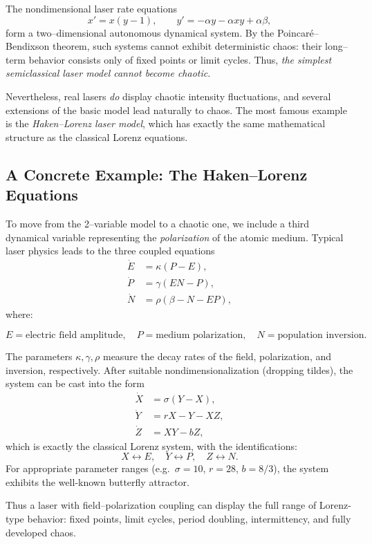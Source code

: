 \documentclass[11pt]{amsart}
\begin{document}
The nondimensional laser rate equations
\[
x' = x (y - 1), \qquad 
y' = - \alpha y - \alpha x y + \alpha \beta,
\]
form a two–dimensional autonomous dynamical system.  
By the Poincaré–Bendixson theorem, such systems cannot exhibit deterministic
chaos: their long–term behavior consists only of fixed points or limit cycles.
Thus, \emph{the simplest semiclassical laser model cannot become chaotic}.

Nevertheless, real lasers \emph{do} display chaotic intensity fluctuations, and
several extensions of the basic model lead naturally to chaos.  The most
famous example is the \emph{Haken–Lorenz laser model}, which has exactly the
same mathematical structure as the classical Lorenz equations. 

\subsection{A Concrete Example: The Haken--Lorenz Equations}

To move from the 2--variable model to a chaotic one, we include a third
dynamical variable representing the \emph{polarization} of the atomic medium.
Typical laser physics leads to the three coupled equations
\begin{align}
\dot E &= \kappa (P - E), \label{HL1}\\[2mm]
\dot P &= \gamma (E N - P), \label{HL2}\\[2mm]
\dot N &= \rho (\beta - N - E P), \label{HL3}
\end{align}
where:

\[
E = \text{electric field amplitude}, \quad 
P = \text{medium polarization},\quad 
N = \text{population inversion}.
\]

The parameters $\kappa, \gamma, \rho$ measure the decay rates of the field,
polarization, and inversion, respectively.  After suitable nondimensionalization
(dropping tildes), the system can be cast into the form
\begin{align}
\dot X &= \sigma (Y - X), \\
\dot Y &= r X - Y - X Z, \\
\dot Z &= X Y - b Z,
\end{align}
which is exactly the classical Lorenz system, with the identifications:
\[
X \leftrightarrow E, \quad 
Y \leftrightarrow P, \quad 
Z \leftrightarrow N.
\]
For appropriate parameter ranges 
(e.g.\ $\sigma = 10$, $r = 28$, $b = 8/3$),
the system exhibits the well-known butterfly attractor.

Thus a laser with field--polarization coupling can display the full range of
Lorenz-type behavior: fixed points, limit cycles, period doubling,
intermittency, and fully developed chaos.
\end{document}
